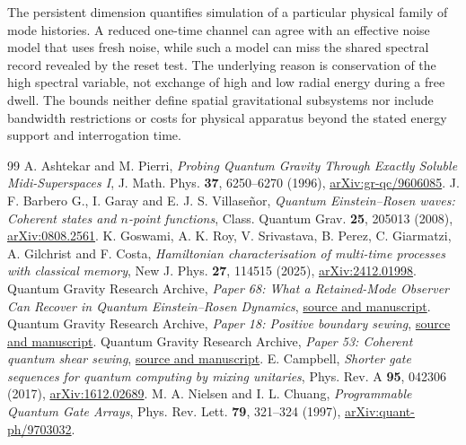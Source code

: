 \documentclass[11pt]{article}
\theoremstyle{remark}
\begin{document}
The persistent dimension quantifies simulation of a particular
physical family of mode histories. A reduced one-time channel can
agree with an effective noise model that uses fresh noise, while
such a model can miss the shared spectral record revealed by
the reset test. The underlying reason is conservation of the high
spectral variable, not exchange of high and low radial energy
during a free dwell. The bounds neither define spatial gravitational
subsystems nor include bandwidth restrictions or costs for physical
apparatus beyond the stated energy support and interrogation time.

\begin{thebibliography}{99}
A. Ashtekar and M. Pierri,
\emph{Probing Quantum Gravity Through Exactly Soluble Midi-Superspaces I},
J. Math. Phys. \textbf{37}, 6250--6270 (1996),
\href{https://arxiv.org/abs/gr-qc/9606085}{arXiv:gr-qc/9606085}.
J. F. Barbero G., I. Garay and E. J. S. Villase\~nor,
\emph{Quantum Einstein--Rosen waves: Coherent states and \(n\)-point functions},
Class. Quantum Grav. \textbf{25}, 205013 (2008),
\href{https://arxiv.org/abs/0808.2561}{arXiv:0808.2561}.
K. Goswami, A. K. Roy, V. Srivastava, B. Perez, C. Giarmatzi,
A. Gilchrist and F. Costa,
\emph{Hamiltonian characterisation of multi-time processes with classical memory},
New J. Phys. \textbf{27}, 114515 (2025),
\href{https://arxiv.org/abs/2412.01998}{arXiv:2412.01998}.
Quantum Gravity Research Archive,
\emph{Paper 68: What a Retained-Mode Observer Can Recover in Quantum Einstein--Rosen Dynamics},
\href{https://github.com/g3173028019-beep/ai-automated-quantum-gravity-research/tree/main/papers/68-einstein-rosen-spectral-memory}{source and manuscript}.
Quantum Gravity Research Archive,
\emph{Paper 18: Positive boundary sewing},
\href{https://github.com/g3173028019-beep/ai-automated-quantum-gravity-research/tree/main/papers/18-positive-boundary-sewing}{source and manuscript}.
Quantum Gravity Research Archive,
\emph{Paper 53: Coherent quantum shear sewing},
\href{https://github.com/g3173028019-beep/ai-automated-quantum-gravity-research/tree/main/papers/53-coherent-quantum-shear-sewing}{source and manuscript}.
E. Campbell,
\emph{Shorter gate sequences for quantum computing by mixing unitaries},
Phys. Rev. A \textbf{95}, 042306 (2017),
\href{https://arxiv.org/abs/1612.02689}{arXiv:1612.02689}.
M. A. Nielsen and I. L. Chuang,
\emph{Programmable Quantum Gate Arrays},
Phys. Rev. Lett. \textbf{79}, 321--324 (1997),
\href{https://arxiv.org/abs/quant-ph/9703032}{arXiv:quant-ph/9703032}.

\end{thebibliography}
\end{document}
